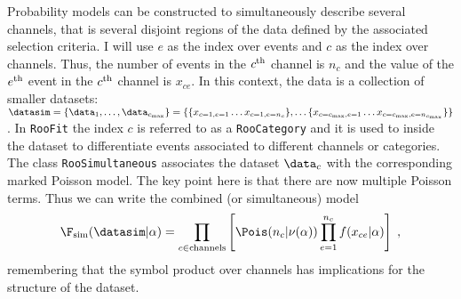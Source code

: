 Probability models can be constructed to simultaneously describe several channels, that is several disjoint regions of the data defined by the associated selection criteria.  I will use $e$ as the index over events and $c$ as the index over channels.  Thus, the number of events in the $c^{\rm th}$ channel is $n_c$ and the value of the $e^{\rm th}$ event in the $c^{\rm th}$ channel is $x_{ce}$.  In this context, the data is a collection of smaller datasets: \mbox{$\datasim=\{\data_1, \dots, \data_{c_{\rm max}}\}=\{\{x_{c=1,e=1}\dots x_{c=1,e=n_c}\}, \dots \{x_{c=c_{\rm max},e=1}\dots x_{c=c_{\rm max},e=n_{c_{\rm max}}} \}\}$}.  In \texttt{RooFit} the index $c$ is referred to as a \texttt{RooCategory} and it is used to inside the dataset to differentiate events associated to different channels or categories. The class \texttt{RooSimultaneous} associates the dataset $\data_c$ with the corresponding marked Poisson model.  The key point here is that there are now multiple Poisson terms.  Thus we can write the combined (or simultaneous) model 
\begin{equation}
\label{eqn:simultaneous}
\F_{\textrm{sim}}(\datasim|\alpha) = \prod_{c\in\rm channels} \left[ \Pois(n_c|\nu(\alpha)) \prod_{e=1}^{n_c} f(x_{ce}|\alpha) \right] \; ,
\end{equation}
remembering that the symbol product over channels has implications for the structure of the dataset.

